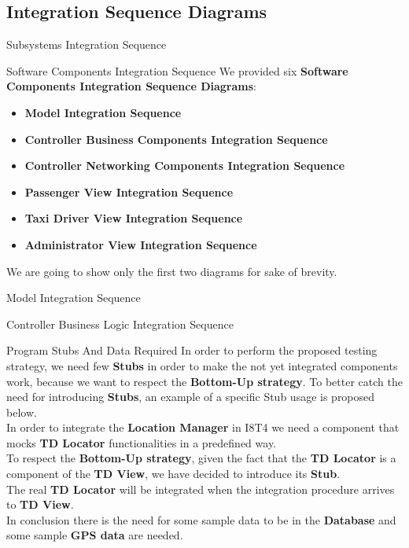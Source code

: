 \documentclass{../common/latex_classes/pdf_presentation}
\begin{document}
	\subsection{Integration Sequence Diagrams}
	\begin{frame}{Subsystems Integration Sequence}
	\end{frame}	
	\begin{frame}{Software Components Integration Sequence}
		We provided six \textbf{Software Components Integration Sequence Diagrams}:
		\begin{itemize}
			\item \textbf{Model Integration Sequence}
			\item \textbf{Controller Business Components Integration Sequence}
			\item \textbf{Controller Networking Components Integration Sequence}
			\item \textbf{Passenger View Integration Sequence}
			\item \textbf{Taxi Driver View Integration Sequence}
			\item \textbf{Administrator View Integration Sequence}
		\end{itemize}
		We are going to show only the first two diagrams for sake of brevity.
	\end{frame}
	\begin{frame}{Model Integration Sequence}
	\end{frame}
	\begin{frame}{Controller Business Logic Integration Sequence}
	\end{frame}
	\begin{frame}{Program Stubs And Data Required}
		In order to perform the proposed testing strategy, we need few \textbf{Stubs} in order to make the not yet integrated components work, because we want to respect the \textbf{Bottom-Up strategy}.
		\medskip
		To better catch the need for introducing \textbf{Stubs}, an example of a specific Stub usage is proposed below.\\
		In order to integrate the \textbf{Location Manager} in I8T4 we need a component that mocks \textbf{TD Locator} functionalities in a predefined way. \\
		To respect the \textbf{Bottom-Up strategy}, given the fact that the \textbf{TD Locator} is a component of the \textbf{TD View}, we have decided to introduce its \textbf{Stub}. \\
		The real \textbf{TD Locator} will be integrated when the integration procedure arrives to \textbf{TD View}.\\
		\medskip
		In conclusion there is the need for some sample data to be in the \textbf{Database} and some sample \textbf{GPS data} are needed.
	\end{frame}
\end{document}
